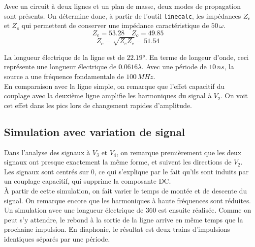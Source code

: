 Avec un circuit à deux lignes et un plan de masse, deux modes de propagation sont présents. On détermine donc, à partir de l'outil \texttt{linecalc}, les impédances $Z_e$ et $Z_o$ qui permettent de conserver une impédance caractéristique de $50\,\omega$.
\[Z_e = 53.28\quad Z_o = 49.85\]
\[Z_c = \sqrt{Z_eZ_c} = 51.54\]

La longueur électrique de la ligne est de $22.19°$. En terme de longeur d'onde, ceci représente une longueur électrique de $0.0616\lambda$. Avec une période de $10\,ns$, la source a une fréquence fondamentale de $100\,MHz$. 
\\
En comparaison avec la ligne simple, on remarque que l'effet capacitif du couplage avec la deuxième ligne amplifie les harmoniques du signal à $V_2$. On voit cet effet dans les pics lors de changement rapides d'amplitude.


\subsection{Simulation avec variation de signal}
Dans l'analyse des signaux à $V_3$ et $V_4$, on remarque premièrement que les deux signaux ont presque exactement la même forme, et suivent les directions de $V_2$. Les signaux sont centrés sur 0, ce qui s'explique par le fait qu'ils sont induits par un couplage capacitif, qui supprime la composante DC. 
\\
À partir de cette simulation, on fait varier le temps de montée et de descente du signal. On remarque encore que les harmoniques à haute fréquences sont réduites. 
\\
Un simulation avec une longueur électrique de 360 est ensuite réalisée. Comme on peut s'y attendre, le rebond à la sortie de la ligne arrive en même temps que la prochaine impulsion. En diaphonie, le résultat est deux trains d'impulsions identiques séparés par une période.


